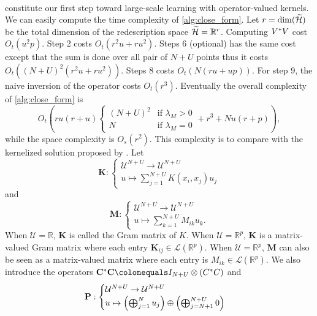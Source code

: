 \paragraph{}
 constitute our first step toward large-scale learning with operator-valued kernels. We can easily compute the time complexity of \cref{alg:close_form}. Let $r=\dim(\widetilde{\mathcal{H}})$ be the total dimension of the redescription space $\widetilde{\mathcal{H}}=\mathbb{R}^{r}$. Computing $V^* V$ cost $O_t(u^2p)$. Step 2 costs $O_t(r^2u + ru^2)$. Steps 6 (optional) has the same cost except that the sum is done over all pair of $N+U$ points thus it costs $O_t((N+U)^2(r^2u + r u^2))$. Steps 8 costs $O_t(N(ru + up))$. For step 9, the naive inversion of the operator costs $O_t(r^3)$. Eventually the overall complexity of \cref{alg:close_form} is
\begin{dmath*}
O_t\left(ru(r + u) \begin{cases} (N+U)^2 & \text{if $\lambda_M > 0$} \\ N & \text{if $\lambda_M = 0$} \end{cases}+ r^3 + Nu(r+p)
\right),
\end{dmath*}
while the space complexity is $O_s(r^2)$. This complexity is to compare with the kernelized solution proposed by \citet{minh2016unifying}. Let
\begin{dmath*}
\mathbf{K}:\begin{cases}
\mathcal{U}^{N+U} \to \mathcal{U}^{N+U} \\
u\mapsto\sum_{j=1}^{N+U}K(x_i, x_j)u_j
\end{cases}
\end{dmath*}
and
\begin{dmath*}
\mathbf{M}:\begin{cases}
\mathcal{U}^{N+U} \to \mathcal{U}^{N+U} \\
u\mapsto\sum_{k=1}^{N+U}M_{ik}u_k.
\end{cases}
\end{dmath*}
When $\mathcal{U}=\mathbb{R}$, $\mathbf{K}$ is called the Gram matrix of $K$. When $\mathcal{U}=\mathbb{R}^p$, $\mathbf{K}$ is a matrix-valued Gram matrix where each entry $\mathbf{K}_{ij}\in\mathcal{L}(\mathbb{R}^p)$. When $\mathcal{U}=\mathbb{R}^p$, $\mathbf{M}$ can also be seen as a matrix-valued matrix where each entry is $M_{ik}\in\mathcal{L}(\mathbb{R}^p)$. We also introduce the operators $\mathbf{C}^\adjoint \mathbf{C}\colonequals I_{N+U} \otimes (C^\adjoint C)$ and
\begin{dmath*}
\mathbf{P}:\begin{cases}
\mathcal{U}^{N+U} \to \mathcal{U}^{N+U} \\
u\mapsto \left(\Vect_{j=1}^Nu_j\right) \oplus \left(\Vect_{j=N+1}^{N+U}0\right)
\end{cases}
\end{dmath*}
